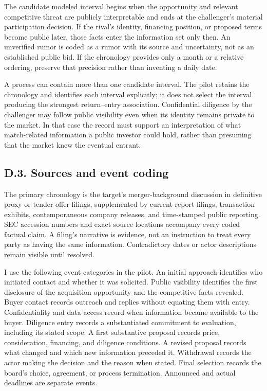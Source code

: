 \documentclass[
  11pt,
]{article}
\begin{document}
The candidate modeled interval begins when the opportunity and relevant
competitive threat are publicly interpretable and ends at the
challenger's material participation decision. If the rival's identity,
financing position, or proposed terms become public later, those facts
enter the information set only then. An unverified rumor is coded as a
rumor with its source and uncertainty, not as an established public bid.
If the chronology provides only a month or a relative ordering, preserve
that precision rather than inventing a daily date.

A process can contain more than one candidate interval. The pilot
retains the chronology and identifies each interval explicitly; it does
not select the interval producing the strongest return--entry
association. Confidential diligence by the challenger may follow public
visibility even when its identity remains private to the market. In that
case the record must support an interpretation of what match-related
information a public investor could hold, rather than presuming that the
market knew the eventual entrant.

\subsection{D.3. Sources and event coding}\label{oa-d-coding}

The primary chronology is the target's merger-background discussion in
definitive proxy or tender-offer filings, supplemented by current-report
filings, transaction exhibits, contemporaneous company releases, and
time-stamped public reporting. SEC accession numbers and exact source
locations accompany every coded factual claim. A filing's narrative is
evidence, not an instruction to treat every party as having the same
information. Contradictory dates or actor descriptions remain visible
until resolved.

I use the following event categories in the pilot. An initial approach
identifies who initiated contact and whether it was solicited. Public
visibility identifies the first disclosure of the acquisition
opportunity and the competitive facts revealed. Buyer contact records
outreach and replies without equating them with entry. Confidentiality
and data access record when information became available to the buyer.
Diligence entry records a substantiated commitment to evaluation,
including its stated scope. A first substantive proposal records price,
consideration, financing, and diligence conditions. A revised proposal
records what changed and which new information preceded it. Withdrawal
records the actor making the decision and the reason when stated. Final
selection records the board's choice, agreement, or process termination.
Announced and actual deadlines are separate events.
\end{document}
